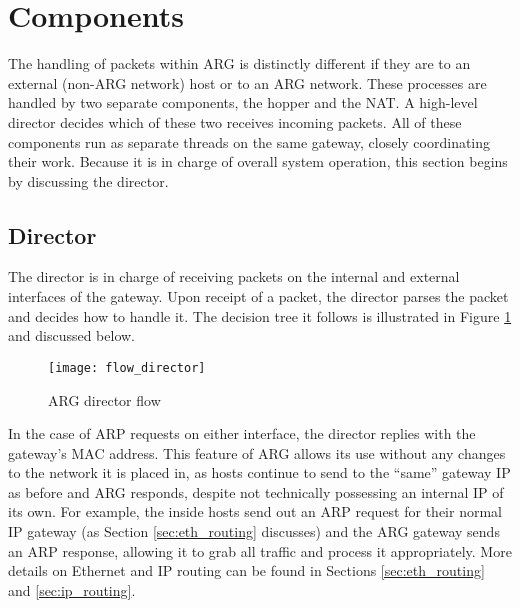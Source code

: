 
\section{Components}
\label{sec:arg_components}
The handling of packets within ARG is distinctly different if they are to an external (non-ARG network) host or to an ARG network. These processes are handled by two separate components, the hopper and the NAT. A high-level director decides which of these two receives incoming packets. All of these components run as separate threads on the same gateway, closely coordinating their work. Because it is in charge of overall system operation, this section begins by discussing the director.

\subsection{Director}
\label{sec:arg_director}
\par The director is in charge of receiving packets on the internal and external interfaces of the gateway. Upon receipt of a packet, the director parses the packet and decides how to handle it. The decision tree it follows is illustrated in Figure \ref{fig:arg_director_flow} and discussed below.

\begin{figure}
\caption{\ac{ARG} director flow}
\label{fig:arg_director_flow}
\centering
\texttt{[image: flow\_director]}
\end{figure}

\par In the case of \ac{ARP} requests on either interface, the director replies with the gateway's \ac{MAC} address. This feature of \ac{ARG} allows its use without any changes to the network it is placed in, as hosts continue to send to the ``same'' gateway IP as before and \ac{ARG} responds, despite not technically possessing an internal \ac{IP} of its own. For example, the inside hosts send out an \ac{ARP} request for their normal \ac{IP} gateway (as Section \ref{sec:eth_routing} discusses) and the \ac{ARG} gateway sends an \ac{ARP} response, allowing it to grab all traffic and process it appropriately. More details on Ethernet and \ac{IP} routing can be found in Sections \ref{sec:eth_routing} and \ref{sec:ip_routing}.


